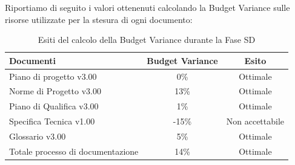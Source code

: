 			Riportiamo di seguito i valori ottenenuti calcolando la Budget Variance sulle risorse utilizzate per la stesura di ogni documento:
			\begin{table}[H]
					\centering
					\begin{tabu}{| l | c | c |}
							\hline
							Documenti 							& Budget Variance	& Esito		\\ \hline \hline
							
							Piano di progetto v3.00				& 0\% 		& Ottimale  \\ \hline
							Norme di Progetto v3.00 			& 13\%		& Ottimale  \\ \hline
							Piano di Qualifica v3.00 			& 1\%		& Ottimale  \\ \hline
							Specifica Tecnica v1.00 			& -15\%		& Non accettabile  \\ \hline
							Glossario v3.00					 	& 5\% 		& Ottimale  \\ \hline
							Totale processo di documentazione & 14\% & Ottimale \\ \hline
						\end{tabu}
					\caption{Esiti del calcolo della Budget Variance durante la Fase SD}
				\end{table}

